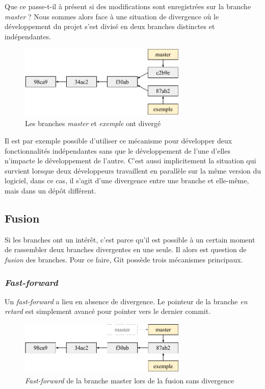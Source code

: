 \documentclass[11pt,a4paper]{article}
\begin{document}
Que ce passe-t-il à présent si des modifications sont enregistrées sur la branche \textit{master} ? Nous sommes alors face à une situation de divergence où le développement du projet s'est divisé en deux branches distinctes et indépendantes.

\begin{figure}[h]
\begin{center}
\includegraphics[width=8cm]{img_divergence}
\caption{Les branches \textit{master} et \textit{exemple} ont divergé}
\end{center}
\end{figure}

Il est par exemple possible d'utiliser ce mécanisme pour développer deux fonctionnalités indépendantes sans que le développement de l'une d'elles n'impacte le développement de l'autre.
C'est aussi implicitement la situation qui survient lorsque deux développeurs travaillent en parallèle sur la même version du logiciel, dans ce cas, il s'agit d'une divergence entre une branche et elle-même, mais dans un dépôt différent.

\subsection{Fusion}

Si les branches ont un intérêt, c'est parce qu'il est possible à un certain moment de rassembler deux branches divergentes en une seule. Il alors est question de \textit{fusion} des branches. Pour ce faire, Git possède trois mécanismes principaux.

\subsubsection{\textit{Fast-forward}}

Un \textit{fast-forward} a lieu en absence de divergence. Le pointeur de la branche \textit{en retard} est simplement avancé pour pointer vers le dernier commit.

\begin{figure}[h]
\begin{center}
\includegraphics[width=8cm]{img_fastf}
\caption{\textit{Fast-forward} de la branche master lors de la fusion sans divergence}
\end{center}
\end{figure}
\end{document}
